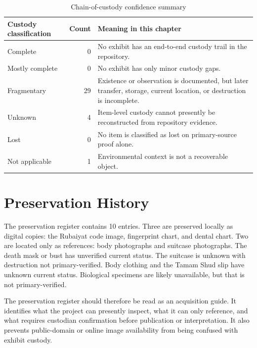 \begin{table}[htbp]
\centering
\caption{Chain-of-custody confidence summary}
\label{tab:chain-of-custody-summary-ch6}
\begin{tabularx}{\textwidth}{>{\raggedright\arraybackslash}p{}r>{\raggedright\arraybackslash}X}
\toprule
Custody classification & Count & Meaning in this chapter \\
\midrule
Complete & 0 & No exhibit has an end-to-end custody trail in the repository. \\
Mostly complete & 0 & No exhibit has only minor custody gaps. \\
Fragmentary & 29 & Existence or observation is documented, but later transfer, storage, current location, or destruction is incomplete. \\
Unknown & 4 & Item-level custody cannot presently be reconstructed from repository evidence. \\
Lost & 0 & No item is classified as lost on primary-source proof alone. \\
Not applicable & 1 & Environmental context is not a recoverable object. \\
\bottomrule
\end{tabularx}
\end{table}

\section{Preservation History}

The preservation register contains 10 entries. Three are preserved locally as digital copies: the Rubaiyat code image, fingerprint chart, and dental chart. Two are located only as references: body photographs and suitcase photographs. The death mask or bust has unverified current status. The suitcase is unknown with destruction not primary-verified. Body clothing and the Tamam Shud slip have unknown current status. Biological specimens are likely unavailable, but that is not primary-verified.

The preservation register should therefore be read as an acquisition guide. It identifies what the project can presently inspect, what it can only reference, and what requires custodian confirmation before publication or interpretation. It also prevents public-domain or online image availability from being confused with exhibit custody.

